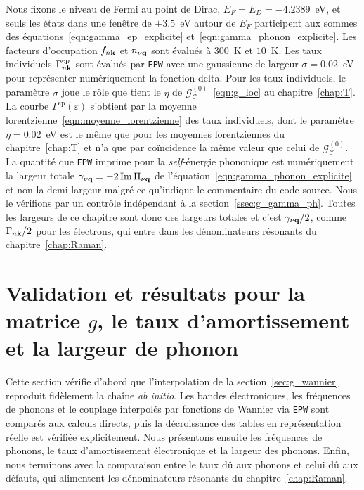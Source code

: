 Nous fixons le niveau de Fermi au point de Dirac, $E_F=E_D=-4.2389$~eV, et seuls les états dans une fenêtre de $\pm 3.5$~eV autour de $E_F$ participent aux sommes des équations~\eqref{eqn:gamma_ep_explicite} et~\eqref{eqn:gamma_phonon_explicite}. Les facteurs d'occupation $f_{n\mathbf{k}}$ et $n_{\nu\mathbf{q}}$ sont évalués à $300$~K et $10$~K. Les taux individuels $\Gamma_{n\mathbf{k}}^\text{ep}$ sont évalués par \texttt{EPW} avec une gaussienne de largeur $\sigma=0.02$~eV pour représenter numériquement la fonction delta. Pour les taux individuels, le paramètre $\sigma$ joue le rôle que tient le $\eta$ de $\mathcal{G}^{(0)}_\mathcal{C}$~\eqref{eqn:g_loc} au chapitre~\ref{chap:T}. La courbe $\Gamma^\text{ep}(\varepsilon)$ s'obtient par la moyenne lorentzienne~\eqref{eqn:moyenne_lorentzienne} des taux individuels, dont le paramètre $\eta=0.02$~eV est le même que pour les moyennes lorentziennes du chapitre~\ref{chap:T} et n'a que par coïncidence la même valeur que celui de $\mathcal{G}^{(0)}_\mathcal{C}$. La quantité que \texttt{EPW} imprime pour la \textit{self}-énergie phononique est numériquement la largeur totale $\gamma_{\nu\mathbf{q}}=-2\,\mathrm{Im}\,\Pi_{\nu\mathbf{q}}$ de l'équation~\eqref{eqn:gamma_phonon_explicite} et non la demi-largeur malgré ce qu'indique le commentaire du code source. Nous le vérifions par un contrôle indépendant à la section~\ref{ssec:g_gamma_ph}. Toutes les largeurs de ce chapitre sont donc des largeurs totales et c'est $\gamma_{\nu\mathbf{q}}/2$, comme $\Gamma_{n\mathbf{k}}/2$ pour les électrons, qui entre dans les dénominateurs résonants du chapitre~\ref{chap:Raman}.

\section{Validation et résultats pour la matrice $g$, le taux d'amortissement et la largeur de phonon}\label{sec:g_results}

Cette section vérifie d'abord que l'interpolation de la section~\ref{sec:g_wannier} reproduit fidèlement la chaîne \textit{ab initio}. Les bandes électroniques, les fréquences de phonons et le couplage interpolés par fonctions de Wannier via \texttt{EPW} sont comparés aux calculs directs, puis la décroissance des tables en représentation réelle est vérifiée explicitement. Nous présentons ensuite les fréquences de phonons, le taux d'amortissement électronique et la largeur des phonons. Enfin, nous terminons avec la comparaison entre le taux dû aux phonons et celui dû aux défauts, qui alimentent les dénominateurs résonants du chapitre~\ref{chap:Raman}.

